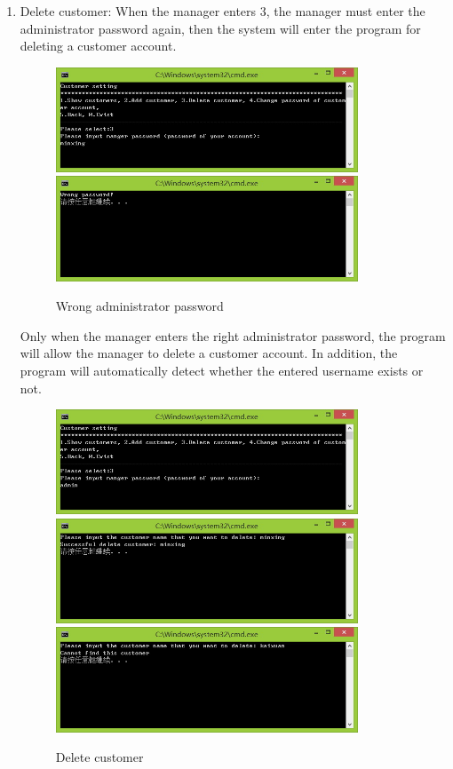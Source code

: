 \documentclass{article}
\begin{document}
\begin{enumerate}
    \item Delete customer:\newline 
    When the manager enters 3, the manager must enter the administrator password again, then the system will enter the program for deleting a customer account. 
        \begin{figure}[H]
        \centering
        \includegraphics[width=0.85\textwidth]{A/A3a0.jpg}
        \includegraphics[width=0.85\textwidth]{A/A3a1.jpg}
        \caption{Wrong administrator password}
        \end{figure}
    \noindent
    Only when the manager enters the right administrator password, the program will allow the manager to delete a customer account. In addition, the program will automatically detect whether the entered username exists or not.
        \begin{figure}[H]
        \centering
        \includegraphics[width=0.85\textwidth]{A/A3b0.jpg}
        \includegraphics[width=0.85\textwidth]{A/A3b1.jpg}
        \includegraphics[width=0.85\textwidth]{A/A3b2.jpg}
        \caption{Delete customer}
        \end{figure}
    

\end{enumerate}
\end{document}
